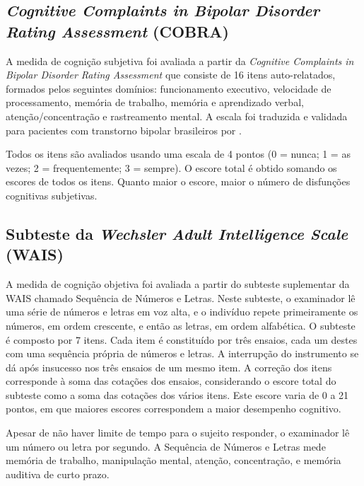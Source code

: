 \documentclass[chapter=TITLE,
               oneside,
               12pt,
               a4paper,
               english,
               brazil]{abntex2}    %
\begin{document}
        \subsection{\textit{Cognitive Complaints in Bipolar Disorder Rating Assessment} 
        (COBRA)}
        \label{sec:cobra}
    
            A medida de cognição subjetiva foi avaliada a partir da
            \textit{Cognitive Complaints in Bipolar Disorder Rating Assessment}
            que consiste de 16 itens auto-relatados, formados pelos seguintes domínios:
            funcionamento executivo, velocidade de processamento, memória de trabalho,
            memória e aprendizado verbal, atenção/concentração e rastreamento mental.
            A escala foi traduzida e validada para pacientes com transtorno bipolar
            brasileiros por \textcite{lima_validity_2018}.

            Todos os itens são avaliados usando uma escala de 4 pontos
            (0 = nunca; 1 = as vezes; 2 = frequentemente; 3 = sempre).
            O escore total é obtido somando os escores de todos os itens.
            Quanto maior o escore, maior o número de disfunções cognitivas subjetivas.
    
        \subsection{Subteste da \textit{Wechsler Adult Intelligence Scale} (WAIS)}
        \label{sec:wais}
    
            A medida de cognição objetiva foi avaliada a partir do subteste
            suplementar da WAIS chamado Sequência de Números e Letras.
            Neste subteste, o examinador lê uma série de números e
            letras em voz alta, e o indivíduo repete primeiramente os números,
            em ordem crescente, e então as letras, em ordem alfabética.
            O subteste é composto por 7 itens.
            Cada item é constituído por três ensaios, cada um destes com uma
            sequência própria de números e letras.
            A interrupção do instrumento se dá após insucesso nos três ensaios
            de um mesmo item.
            A correção dos itens corresponde à soma das cotações dos ensaios,
            considerando o escore total do subteste como a soma das cotações
            dos vários itens. Este escore varia de 0 a 21 pontos, em que maiores
            escores correspondem a maior desempenho cognitivo.
    
            Apesar de não haver limite de tempo para o sujeito responder,
            o examinador lê um número ou letra por segundo.
            A Sequência de Números e Letras mede memória de trabalho,
            manipulação mental, atenção, concentração,
            e memória auditiva de curto prazo. \parencite{wechsler_wais_2004}
\end{document}
